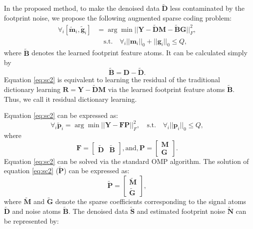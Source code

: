 In the proposed method, to make the denoised data $\tilde{\mathbf{D}}$ less contaminated by the footprint noise, we propose the following augmented sparse coding problem:
\begin{equation}
\label{eq:sc2}
\begin{split}
\forall_i [\tilde{\mathbf{m}}_{i},\tilde{\mathbf{g}}_{i}]&=\arg\min||\mathbf{Y}-\tilde{\mathbf{D}}\mathbf{M} - \tilde{\mathbf{B}}\mathbf{G} ||^{2}_{F}, \\
& \quad\text{s.t.}  \quad \forall_i ||\mathbf{m}_{i}||_{0}+||\mathbf{g}_{i}||_{0} \le Q,
\end{split}
\end{equation}
where $\tilde{\mathbf{B}}$ denotes the learned footprint feature atoms. It can be calculated simply by
\begin{equation}
\label{eq:ftf}
\tilde{\mathbf{B}}=\mathbf{D}-\tilde{\mathbf{D}}.
\end{equation}
Equation \ref{eq:sc2} is equivalent to learning the residual of the traditional dictionary learning $\mathbf{R}=\mathbf{Y}-\tilde{\mathbf{D}}\mathbf{M}$ via the learned footprint feature atoms $\tilde{\mathbf{B}}$. Thus, we call it residual dictionary learning.

Equation \ref{eq:sc2} can be expressed as:
\begin{equation}
\label{eq:sc22}
\forall_i \tilde{\mathbf{p}}_{i}=\arg\min||\mathbf{Y}-\mathbf{F}\mathbf{P} ||^{2}_{F}, \quad\text{s.t.}  \quad \forall_i ||\mathbf{p}_{i}||_{0} \le Q,
\end{equation}
where 
\begin{equation}
\label{eq:scF}
\mathbf{F} = \left[\begin{array}{cc}
\tilde{\mathbf{D}} & \tilde{\mathbf{B}}
\end{array}
\right], \text{and}, 
\mathbf{P} = \left[\begin{array}{c}
\mathbf{M} \\
\mathbf{G}
\end{array}
\right].
\end{equation}
Equation \ref{eq:sc2} can be solved via the standard OMP algorithm. The solution of equation \ref{eq:sc2} ($\tilde{\mathbf{P}}$) can be expressed as:
\begin{equation}
\label{eq:scF}
\tilde{\mathbf{P}} = \left[\begin{array}{c}
\tilde{\mathbf{M}} \\
\tilde{\mathbf{G}}
\end{array}
\right],
\end{equation}
where $\tilde{\mathbf{M}}$ and $\tilde{\mathbf{G}}$ denote the sparse coefficients corresponding to the signal atoms $\tilde{\mathbf{D}}$ and noise atoms $\tilde{\mathbf{B}}$. The denoised data $\tilde{\mathbf{S}}$ and estimated footprint noise $\tilde{\mathbf{N}}$ can be represented by:

